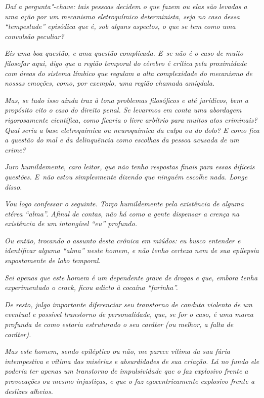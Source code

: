\emph{Daí a pergunta"-chave: tais pessoas decidem o que fazem ou elas são
levadas a uma ação por um mecanismo eletroquímico determinista, seja no
caso dessa ``tempestade'' episódica que é, sob alguns aspectos, o que se
tem como uma convulsão peculiar?}

\emph{Eis uma boa questão, e uma questão complicada. E~se não é o caso
de muito filosofar aqui, digo que a região temporal do cérebro é crítica
pela proximidade com áreas do sistema límbico que regulam a alta
complexidade do mecanismo de nossas emoções, como, por exemplo, uma
região chamada amígdala.}

\emph{Mas, se tudo isso ainda traz à tona problemas filosóficos e até
jurídicos, bem a propósito cito o caso do direito penal. Se levarmos em
conta uma abordagem rigorosamente científica, como ficaria o livre
arbítrio para muitos atos criminais? Qual seria a base eletroquímica ou
neuroquímica da culpa ou do dolo? E como fica a questão do mal e da
delinquência como escolhas da pessoa acusada de um crime?}

\emph{Juro humildemente, caro leitor, que não tenho respostas finais
para essas difíceis questões. E~não estou simplesmente dizendo que
ninguém escolhe nada. Longe disso.}

\emph{Vou logo confessar o seguinte. Torço humildemente pela existência
de alguma etérea ``alma''. Afinal de contas, não há como a gente
dispensar a crença na existência de um intangível ``eu'' profundo.}

\emph{Ou então, trocando o assunto desta crônica em miúdos: eu busco
entender e identificar alguma ``alma'' neste homem, e não tenho certeza
nem de sua epilepsia supostamente de lobo temporal.}

\emph{Sei apenas que este homem é um dependente grave de drogas e que,
embora tenha experimentado o crack, ficou adicto à cocaína
``farinha''.}

\emph{De resto, julgo importante diferenciar seu transtorno de conduta
violento de um eventual e possível transtorno de personalidade, que, se
for o caso, é uma marca profunda de como estaria estruturado o seu
caráter (ou melhor, a falta de caráter).}

\emph{Mas este homem, sendo epiléptico ou não, me parece vítima da sua
fúria intempestiva e vítima das misérias e absurdidades de sua criação.
Lá no fundo ele poderia ter apenas um transtorno de impulsividade que o
faz explosivo frente a provocações ou mesmo injustiças, e que o faz
egocentricamente explosivo frente a deslizes alheios.}

